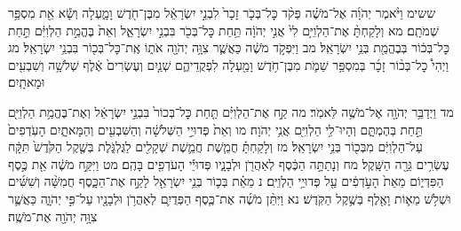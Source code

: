 \documentclass[twoside, openany, parskip=half, 11pt]{book}
\begin{document}
ששימ וַיֹּ֨אמֶר יְהֹוָ֜ה אֶל־מֹשֶׁ֗ה פְּקֹ֨ד כׇּל־בְּכֹ֤ר זָכָר֙ לִבְנֵ֣י יִשְׂרָאֵ֔ל מִבֶּן־חֹ֖דֶשׁ וָמָ֑עְלָה וְשָׂ֕א אֵ֖ת מִסְפַּ֥ר שְׁמֹתָֽם׃ מא וְלָקַחְתָּ֨ אֶת־הַלְוִיִּ֥ם לִי֙ אֲנִ֣י יְהֹוָ֔ה תַּ֥חַת כׇּל־בְּכֹ֖ר בִּבְנֵ֣י יִשְׂרָאֵ֑ל וְאֵת֙ בֶּהֱמַ֣ת הַלְוִיִּ֔ם תַּ֣חַת כׇּל־בְּכ֔וֹר בְּבֶהֱמַ֖ת בְּנֵ֥י יִשְׂרָאֵֽל׃ מב וַיִּפְקֹ֣ד מֹשֶׁ֔ה כַּאֲשֶׁ֛ר צִוָּ֥ה יְהֹוָ֖ה אֹת֑וֹ אֶֽת־כׇּל־בְּכ֖וֹר בִּבְנֵ֥י יִשְׂרָאֵֽל׃ מג וַיְהִי֩ כׇל־בְּכ֨וֹר זָכָ֜ר בְּמִסְפַּ֥ר שֵׁמֹ֛ת מִבֶּן־חֹ֥דֶשׁ וָמַ֖עְלָה לִפְקֻדֵיהֶ֑ם שְׁנַ֤יִם וְעֶשְׂרִים֙ אֶ֔לֶף שְׁלֹשָׁ֥ה וְשִׁבְעִ֖ים וּמָאתָֽיִם׃

מד וַיְדַבֵּ֥ר יְהֹוָ֖ה אֶל־מֹשֶׁ֥ה לֵּאמֹֽר׃ מה קַ֣ח אֶת־הַלְוִיִּ֗ם תַּ֤חַת כׇּל־בְּכוֹר֙ בִּבְנֵ֣י יִשְׂרָאֵ֔ל וְאֶת־בֶּהֱמַ֥ת הַלְוִיִּ֖ם תַּ֣חַת בְּהֶמְתָּ֑ם וְהָיוּ־לִ֥י הַלְוִיִּ֖ם אֲנִ֥י יְהֹוָה׃ מו וְאֵת֙ פְּדוּיֵ֣י הַשְּׁלֹשָׁ֔ה וְהַשִּׁבְעִ֖ים וְהַמָּאתָ֑יִם הָעֹֽדְפִים֙ עַל־הַלְוִיִּ֔ם מִבְּכ֖וֹר בְּנֵ֥י יִשְׂרָאֵֽל׃ מז וְלָקַחְתָּ֗ חֲמֵ֧שֶׁת חֲמֵ֛שֶׁת שְׁקָלִ֖ים לַגֻּלְגֹּ֑לֶת בְּשֶׁ֤קֶל הַקֹּ֙דֶשׁ֙ תִּקָּ֔ח עֶשְׂרִ֥ים גֵּרָ֖ה הַשָּֽׁקֶל׃ מח וְנָתַתָּ֣ה הַכֶּ֔סֶף לְאַהֲרֹ֖ן וּלְבָנָ֑יו פְּדוּיֵ֕י הָעֹדְפִ֖ים בָּהֶֽם׃ מט וַיִּקַּ֣ח מֹשֶׁ֔ה אֵ֖ת כֶּ֣סֶף הַפִּדְי֑וֹם מֵאֵת֙ הָעֹ֣דְפִ֔ים עַ֖ל פְּדוּיֵ֥י הַלְוִיִּֽם׃ נ מֵאֵ֗ת בְּכ֛וֹר בְּנֵ֥י יִשְׂרָאֵ֖ל לָקַ֣ח אֶת־הַכָּ֑סֶף חֲמִשָּׁ֨ה וְשִׁשִּׁ֜ים וּשְׁלֹ֥שׁ מֵא֛וֹת וָאֶ֖לֶף בְּשֶׁ֥קֶל הַקֹּֽדֶשׁ׃ נא וַיִּתֵּ֨ן מֹשֶׁ֜ה אֶת־כֶּ֧סֶף הַפְּדֻיִ֛ם לְאַהֲרֹ֥ן וּלְבָנָ֖יו עַל־פִּ֣י יְהֹוָ֑ה כַּאֲשֶׁ֛ר צִוָּ֥ה יְהֹוָ֖ה אֶת־מֹשֶֽׁה׃
\end{document}

